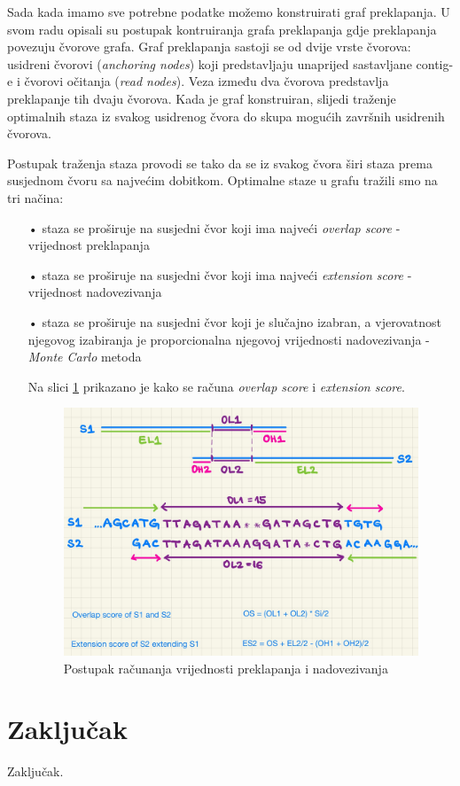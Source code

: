 \documentclass[times, utf8, seminar]{fer}
\begin{document}
\begin{flushleft}
Sada kada imamo sve potrebne podatke možemo konstruirati graf preklapanja. U svom radu \cite{du2021assembly} opisali su postupak kontruiranja grafa preklapanja gdje preklapanja povezuju čvorove grafa. Graf preklapanja sastoji se od dvije vrste čvorova: usidreni čvorovi (\textit{anchoring nodes}) koji predstavljaju unaprijed sastavljane contig-e i čvorovi očitanja (\textit{read nodes}). Veza između dva čvorova predstavlja preklapanje tih dvaju čvorova. Kada je graf konstruiran, slijedi traženje optimalnih staza iz svakog usidrenog čvora do skupa mogućih završnih usidrenih čvorova.

Postupak traženja staza provodi se tako da se iz svakog čvora širi staza prema susjednom čvoru sa najvećim dobitkom. Optimalne staze u grafu tražili smo na tri načina:
\begin{itemize}
	\item[•]{staza se proširuje na susjedni čvor koji ima najveći \textit{overlap score} - vrijednost preklapanja}
	\item[•]{staza se proširuje na susjedni čvor koji ima najveći \textit{extension score} - vrijednost nadovezivanja}
	\item[•]{staza se proširuje na susjedni čvor koji je slučajno izabran, a vjerovatnost njegovog izabiranja je proporcionalna njegovoj vrijednosti nadovezivanja - \textit{Monte Carlo} metoda}

Na slici \ref{fig:scores} prikazano je kako se računa \textit{overlap score} i \textit{extension score}.

\begin{figure}[H]
  \centering
  \includegraphics[width=\textwidth]{scores.jpg}
  \caption{Postupak računanja vrijednosti preklapanja i nadovezivanja}
  \label{fig:scores}
\end{figure}

\end{itemize}
\end{flushleft}


\chapter{Zaključak}
Zaključak.



\end{document}
